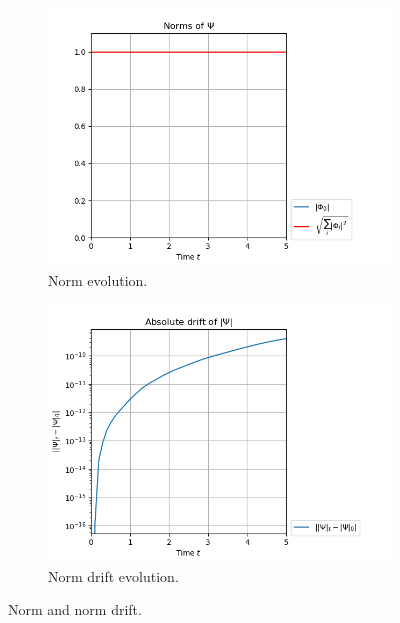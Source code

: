 \documentclass[11pt, a4paper, oneside]{article}
\begin{document}
\begin{figure}[h]
  \begin{subfigure}[b]{0.45 \textwidth}
    \includegraphics[width = \textwidth]{graphics/torsional/norms_block0.PNG}
    \caption{Norm evolution.}
  \end{subfigure}
  \hfill
  \begin{subfigure}[b]{0.45 \textwidth}
    \includegraphics[width = \textwidth]{graphics/torsional/norms_drift_block0_log.PNG}
    \caption{Norm drift evolution.}
  \end{subfigure}
  \caption{Norm and norm drift.}
  \label{fig:cos_norm}
\end{figure}
\end{document}
